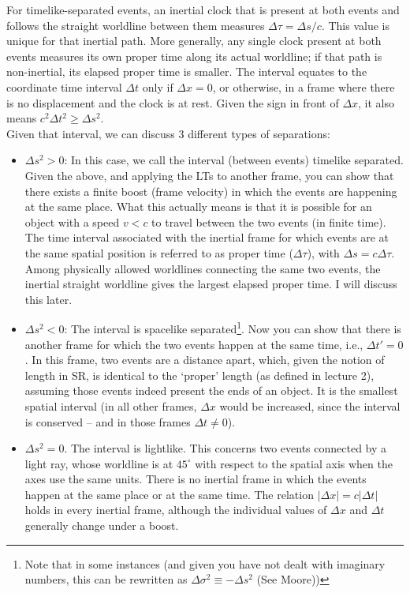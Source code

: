 \documentclass[12pt]{article}
\begin{document}
\noindent
For timelike-separated events, an inertial clock that is present at both events and follows the straight worldline between them measures $\Delta\tau=\Delta s/c$. This value is unique for that inertial path. More generally, any single clock present at both events measures its own proper time along its actual worldline; if that path is non-inertial, its elapsed proper time is smaller. The interval equates to the coordinate time interval $\Delta t$ only if $\Delta x = 0$, or otherwise, in a frame where there is no displacement and the clock is at rest. Given the sign in front of $\Delta x$, it also means $c^2\Delta t^2\geq \Delta s^2$. \\

\noindent
Given that interval, we can discuss 3 different types of separations:
\begin{itemize}
\item $\Delta s^2 > 0$: In this case, we call the interval (between events) timelike separated. Given the above, and applying the LTs to another frame, you can show that there exists a finite boost (frame velocity) in which the events are happening at the same place. What this actually means is that it is possible for an object with a speed $v<c$ to travel between the two events (in finite time).  The time interval associated with the inertial frame for which events are at the same spatial position is referred to as proper time ($\Delta \tau$), with $\Delta s=c\Delta\tau$. Among physically allowed worldlines connecting the same two events, the inertial straight worldline gives the largest elapsed proper time. I will discuss this later.

\item $\Delta s^2 < 0$: The interval is spacelike separated\footnote{Note that in some instances (and given you have not dealt with imaginary numbers, this can be rewritten as $\Delta \sigma^2 \equiv - \Delta s^2$ (See Moore))}. Now you can show that there is another frame for which the two events happen at the same time, i.e., $\Delta t' = 0$. In this frame, two events are a distance apart, which, given the notion of length in SR, is identical to the `proper' length (as defined in lecture 2), assuming those events indeed present the ends of an object. It is the smallest spatial interval (in all other frames, $\Delta x$ would be increased, since the interval is conserved -- and in those frames $\Delta t \neq 0$).
\item $\Delta s^2=0$. The interval is lightlike. This concerns two events connected by a light ray, whose worldline is at $45^\circ$ with respect to the spatial axis when the axes use the same units. There is no inertial frame in which the events happen at the same place or at the same time. The relation $|\Delta x|=c|\Delta t|$ holds in every inertial frame, although the individual values of $\Delta x$ and $\Delta t$ generally change under a boost.
\end{itemize}
\end{document}
